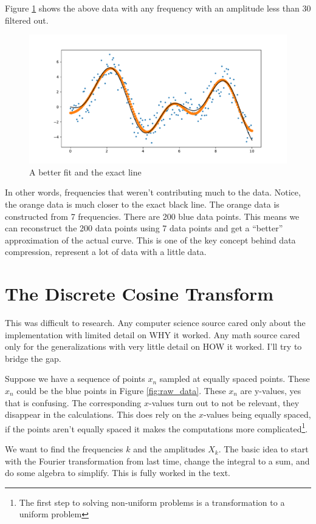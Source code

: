 \documentclass[11pt,letterpaper]{article}
\begin{document}
Figure \ref{fig:cleaned_data} shows the above data with any frequency with an amplitude less than
$30$ filtered out. 
\begin{figure}[!ht]
 \centering
 \includegraphics[width=.6\textwidth]{images/cleaned_data.pdf}
 \caption{A better fit and the exact line}
 \label{fig:cleaned_data}
\end{figure}
In other words, frequencies that weren't contributing much to the data. Notice, the orange data is
much closer to the exact black line. The orange data is constructed from 7 frequencies. There are
200 blue data points. This means we can reconstruct the 200 data points using 7 data points and 
get a ``better'' approximation of the actual curve. This is one of the key concept behind data 
compression, represent a lot of data with a little data.



\section{The Discrete Cosine Transform}

This was difficult to research. Any computer science source cared only about the implementation
with limited detail on WHY it worked. Any math source cared only for the generalizations with
very little detail on HOW it worked. I'll try to bridge the gap.

Suppose we have a sequence of points $x_n$ sampled at equally spaced points. These $x_n$ could
be the blue points in Figure \ref{fig:raw_data}. These $x_n$ are y-values, yes that
is confusing. The corresponding $x$-values turn out to not be relevant, they disappear in the 
calculations. This does rely on the $x$-values being equally spaced, if the points aren't equally 
spaced it makes the computations more complicated\footnote{The first step to solving non-uniform 
problems is a transformation to a uniform problem}. 


We want to find the frequencies $k$ and the amplitudes $X_k$. The basic idea to start with the Fourier
transformation from last time, change the integral to a sum, and do some algebra to simplify. This
is fully worked in the text. 
\end{document}
